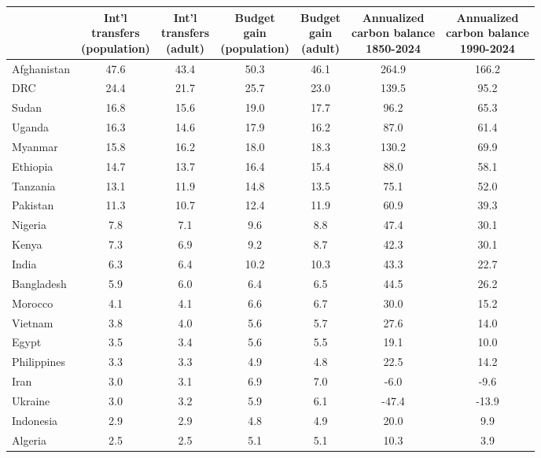 
\begin{tabular}[t]{lcccccc}
\toprule
  & \makecell{Int'l\\transfers\\(population)} & \makecell{Int'l\\transfers\\(adult)} & \makecell{Budget\\gain\\(population)} & \makecell{Budget\\gain\\(adult)} & \makecell{Annualized\\carbon balance\\1850-2024} & \makecell{Annualized\\carbon balance\\1990-2024}\\
\midrule
Afghanistan & 47.6 & 43.4 & 50.3 & 46.1 & 264.9 & 166.2\\
DRC & 24.4 & 21.7 & 25.7 & 23.0 & 139.5 & 95.2\\
Sudan & 16.8 & 15.6 & 19.0 & 17.7 & 96.2 & 65.3\\
Uganda & 16.3 & 14.6 & 17.9 & 16.2 & 87.0 & 61.4\\
Myanmar & 15.8 & 16.2 & 18.0 & 18.3 & 130.2 & 69.9\\
Ethiopia & 14.7 & 13.7 & 16.4 & 15.4 & 88.0 & 58.1\\
Tanzania & 13.1 & 11.9 & 14.8 & 13.5 & 75.1 & 52.0\\
Pakistan & 11.3 & 10.7 & 12.4 & 11.9 & 60.9 & 39.3\\
Nigeria & 7.8 & 7.1 & 9.6 & 8.8 & 47.4 & 30.1\\
Kenya & 7.3 & 6.9 & 9.2 & 8.7 & 42.3 & 30.1\\
India & 6.3 & 6.4 & 10.2 & 10.3 & 43.3 & 22.7\\
Bangladesh & 5.9 & 6.0 & 6.4 & 6.5 & 44.5 & 26.2\\
Morocco & 4.1 & 4.1 & 6.6 & 6.7 & 30.0 & 15.2\\
Vietnam & 3.8 & 4.0 & 5.6 & 5.7 & 27.6 & 14.0\\
Egypt & 3.5 & 3.4 & 5.6 & 5.5 & 19.1 & 10.0\\
Philippines & 3.3 & 3.3 & 4.9 & 4.8 & 22.5 & 14.2\\
Iran & 3.0 & 3.1 & 6.9 & 7.0 & -6.0 & -9.6\\
Ukraine & 3.0 & 3.2 & 5.9 & 6.1 & -47.4 & -13.9\\
Indonesia & 2.9 & 2.9 & 4.8 & 4.9 & 20.0 & 9.9\\
Algeria & 2.5 & 2.5 & 5.1 & 5.1 & 10.3 & 3.9\\

\end{tabular}
